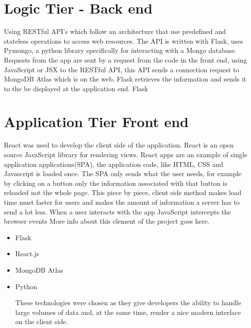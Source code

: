 \section{Logic Tier - Back end}
Using RESTful API's which follow an architecture that use predefined and stateless operations to access web resources.
The API is written with Flask, uses Pymongo, a python library specifically for interacting with a Mongo database.
Requests from the app are sent by a request from the code in the front end, using JavaScript or JSX to the RESTful API, this API sends a connection request to MongoDB Atlas which is on the web. Flask retrieves the information and sends it to the be displayed at the application end.
Flask

\section{Application Tier Front end}
React was used to develop the client side of the application. React is an open source JavaScript library for rendering views. React apps are an example of single application applications(SPA), the application code, like HTML, CSS and Javascript is loaded once. The SPA only sends what the user needs, for example by clicking on a button only the information associated with that button is reloaded not the whole page. This piece by piece, client side method makes load time must faster for users and makes the amount of information a server has to send a lot less.
When a user interacts with the app JavaScript intercepts the browser events
More info about this element of the project goes here.

\begin{itemize}
\item Flask
\item React.js
\item MongoDB Atlas
\item Python


These technologies were chosen as they give developers the ability to handle large volumes of data and, at the same time, render a nice modern interface on the client side.

\end{itemize}

